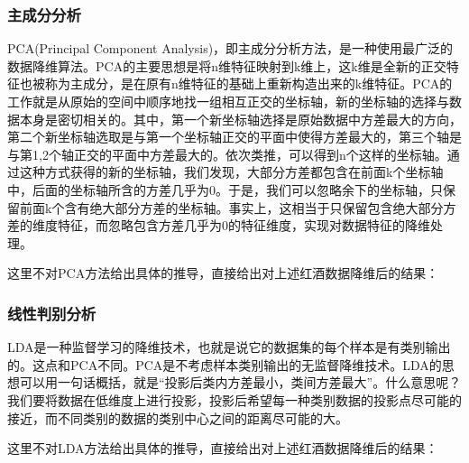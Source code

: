 \documentclass[UTF8]{ctexart}
\begin{document}
\subsubsection{主成分分析}
PCA(Principal Component Analysis)，即主成分分析方法，是一种使用最广泛的数据降维算法。PCA的主要思想是将n维特征映射到k维上，这k维是全新的正交特征也被称为主成分，是在原有n维特征的基础上重新构造出来的k维特征。PCA的工作就是从原始的空间中顺序地找一组相互正交的坐标轴，新的坐标轴的选择与数据本身是密切相关的。其中，第一个新坐标轴选择是原始数据中方差最大的方向，第二个新坐标轴选取是与第一个坐标轴正交的平面中使得方差最大的，第三个轴是与第1,2个轴正交的平面中方差最大的。依次类推，可以得到n个这样的坐标轴。通过这种方式获得的新的坐标轴，我们发现，大部分方差都包含在前面k个坐标轴中，后面的坐标轴所含的方差几乎为0。于是，我们可以忽略余下的坐标轴，只保留前面k个含有绝大部分方差的坐标轴。事实上，这相当于只保留包含绝大部分方差的维度特征，而忽略包含方差几乎为0的特征维度，实现对数据特征的降维处理。

这里不对PCA方法给出具体的推导，直接给出对上述红酒数据降维后的结果：


\begin{figure}[H]
	\centering
  	\centering
\end{figure}



\subsubsection{线性判别分析}
LDA是一种监督学习的降维技术，也就是说它的数据集的每个样本是有类别输出的。这点和PCA不同。PCA是不考虑样本类别输出的无监督降维技术。LDA的思想可以用一句话概括，就是“投影后类内方差最小，类间方差最大”。什么意思呢？ 我们要将数据在低维度上进行投影，投影后希望每一种类别数据的投影点尽可能的接近，而不同类别的数据的类别中心之间的距离尽可能的大。

这里不对LDA方法给出具体的推导，直接给出对上述红酒数据降维后的结果：
\begin{figure}[H]
	\centering
  	\centering
\end{figure}
\end{document}
